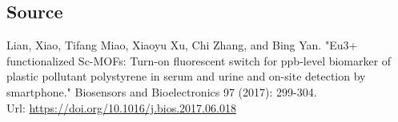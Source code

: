 \documentclass{article}
\begin{document}
\subsection{Source}
Lian, Xiao, Tifang Miao, Xiaoyu Xu, Chi Zhang, and Bing Yan. "Eu3+ 
functionalized Sc-MOFs: Turn-on fluorescent switch for ppb-level biomarker of 
plastic pollutant polystyrene in serum and urine and on-site detection by 
smartphone." Biosensors and Bioelectronics 97 (2017): 299-304.
\\
Url: \url{https://doi.org/10.1016/j.bios.2017.06.018}
\end{document}
